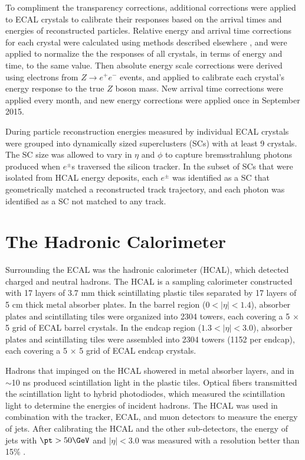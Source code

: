 To compliment the transparency corrections, additional corrections were applied to ECAL crystals 
to calibrate their responses based on the arrival times and energies of reconstructed particles.  Relative energy 
and arrival time corrections for each crystal were calculated using methods described elsewhere \cite{eGammaMonitCalib2011}, and 
were applied to normalize the the responses of all crystals, in terms of energy and time, to the same value.  Then 
absolute energy scale corrections were derived using electrons from $Z \rightarrow e^{+}e^{-}$ events, and applied 
to calibrate each crystal's energy response to the true $Z$ boson mass.  New arrival time corrections were applied 
every month, and new energy corrections were applied once in September 2015.

During particle reconstruction energies measured by individual ECAL crystals were grouped into dynamically 
sized superclusters (SCs) with at least 9 crystals.  The SC size was allowed to vary in $\eta$ and $\phi$ to capture 
bremsstrahlung photons produced when $e^{\pm}$s traversed the silicon tracker.  In the subset of SCs that were isolated 
from HCAL energy deposits, each $e^{\pm}$ was identified as a SC that geometrically matched a reconstructed track 
trajectory, and each photon was identified as a SC not matched to any track.


\section{The Hadronic Calorimeter}
\label{sec:hcalDescription}
Surrounding the ECAL was the hadronic calorimeter (HCAL), which detected charged and neutral hadrons.  The 
HCAL is a sampling calorimeter constructed with 17 layers of 3.7 mm thick scintillating plastic tiles separated by 
17 layers of 5 cm thick metal absorber plates.  In the barrel 
region ($0 < |\eta| < 1.4$), absorber plates and scintillating tiles were organized into 2304 towers, each 
covering a 5 $\times$ 5 grid of ECAL barrel crystals.  In the endcap region ($1.3 < |\eta| < 3.0$), absorber 
plates and scintillating tiles were assembled into 2304 towers (1152 per endcap), each covering 
a 5 $\times$ 5 grid of ECAL endcap crystals.

Hadrons that impinged on the HCAL showered in metal absorber layers, and in $\sim$10 ns produced scintillation 
light in the plastic tiles.  Optical fibers transmitted the scintillation light to hybrid photodiodes, 
which measured the scintillation light to determine the energies of incident hadrons.  The HCAL was used in 
combination with the tracker, ECAL, and muon detectors to measure the energy of jets.  After calibrating the 
HCAL and the other sub-detectors, the energy of jets with $\pt > 50\GeV$ and $|\eta| < 3.0$ was measured with 
a resolution better than 15\% \cite{jetResolutionInCollisions}.

